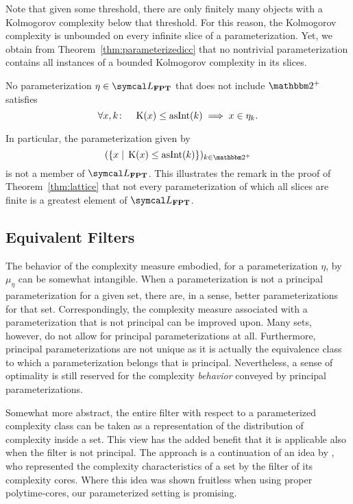 Note that given some threshold, there are only finitely many objects with a Kolmogorov complexity below that threshold.
For this reason, the Kolmogorov complexity is unbounded on every infinite slice of a parameterization.
Yet, we obtain from Theorem~\ref{thm:parameterizedicc} that no nontrivial parameterization contains all instances of a bounded Kolmogorov complexity in its slices.
\begin{corollary}
  No parameterization $\eta \in \calL_\cl{FPT}$ that does not include $\binary^+$ satisfies
  \begin{equation*}
    \forall x, k\colon\quad\operatorname{K}(x) \le \operatorname{asInt}(k) \implies x \in \eta_k.
  \end{equation*}
\end{corollary}

In particular, the parameterization given by
\begin{equation}
\label{eq:kcparameterization}
  (\{x \st \KC(x) \le \asNat(k)\})_{k \in \binary^+}
\end{equation}
is not a member of $\calL_\cl{FPT}$.
This illustrates the remark in the proof of Theorem~\ref{thm:lattice} that not every parameterization of which all slices are finite is a greatest element of $\calL_\cl{FPT}$.

\subsection{Equivalent Filters}
The behavior of the complexity measure embodied, for a parameterization $\eta$, by $\mu_\eta$ can be somewhat intangible.
When a parameterization is not a principal parameterization for a given set, there are, in a sense, better parameterizations for that set.
Correspondingly, the complexity measure associated with a parameterization that is not principal can be improved upon.
Many sets, however, do not allow for principal parameterizations at all.
Furthermore, principal parameterizations are not unique as it is actually the equivalence class to which a parameterization belongs that is principal.
Nevertheless, a sense of optimality is still reserved for the complexity \emph{behavior} conveyed by principal parameterizations.

Somewhat more abstract, the entire filter with respect to a parameterized complexity class can be taken as a representation of the distribution of complexity inside a set.
This view has the added benefit that it is applicable also when the filter is not principal.
The approach is a continuation of an idea by \textcite{orponen1986classification}, who represented the complexity characteristics of a set by the filter of its complexity cores.
Where this idea was shown fruitless when using proper polytime-cores, our parameterized setting is promising.

